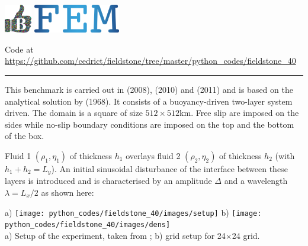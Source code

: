 \includegraphics[height=1.25cm]{images/pictograms/benchmark}
\includegraphics[height=1.25cm]{images/pictograms/FEM}




\begin{center}
Code at \url{https://github.com/cedrict/fieldstone/tree/master/python_codes/fieldstone_40}
\end{center}

\par\noindent\rule{\textwidth}{0.4pt}

This benchmark is carried out in \textcite{deka08} (2008), \textcite{gery10} (2010) and \textcite{thie11} (2011) 
and is based on the analytical solution by \textcite{ramb68} (1968). 
It consists of a buoyancy-driven two-layer system driven. 
The domain is a square of size $512\times512$km. 
Free slip are imposed on the sides while no-slip boundary conditions are imposed on the
top and the bottom of the box.

Fluid 1 $(\rho_1,\eta_1)$ of thickness $h_1$ overlays 
fluid 2 $(\rho_2,\eta_2)$ of thickness $h_2$ (with $h_1+h_2=L_y$).
An initial sinusoidal disturbance of the interface between these
layers is introduced and is characterised by an amplitude $\Delta$ and a
wavelength $\lambda=L_x/2$ as shown here: 

\begin{center}
a) \texttt{[image: python\_codes/fieldstone\_40/images/setup]}
b) \texttt{[image: python\_codes/fieldstone\_40/images/dens]}\\
{\captionfont  a) Setup of the experiment, taken from \cite{thie11}; b) grid setup for 24$\times$24 grid.} 
\end{center}

